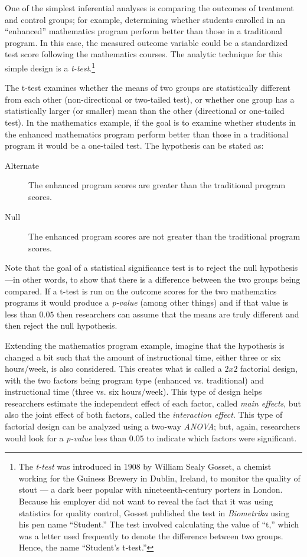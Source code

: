 One of the simplest inferential analyses is comparing the outcomes of treatment and control groups; for example, determining whether students enrolled in an ``enhanced'' mathematics program perform better than those in a traditional program. In this case, the measured outcome variable could be a standardized test score following the mathematics courses. The analytic technique for this simple design is a \textit{t-test}.\footnote{The \textit{t-test} was introduced in $ 1908 $ by William Sealy Gosset, a chemist working for the Guiness Brewery in Dublin, Ireland, to monitor the quality of stout --- a dark beer popular with nineteenth-century porters in London. Because his employer did not want to reveal the fact that it was using statistics for quality control, Gosset published the test in \textit{Biometrika} using his pen name ``Student.'' The test involved calculating the value of ``t,'' which was a letter used frequently to denote the difference between two groups. Hence, the name ``Student's t-test.''}

The t-test examines whether the means of two groups are statistically different from each other (non-directional or two-tailed test), or whether one group has a statistically larger (or smaller) mean than the other (directional or one-tailed test). In the mathematics example, if the goal is to examine whether students in the enhanced mathematics program perform better than those in a traditional program it would be a one-tailed test. The hypothesis can be stated as:

\begin{description}
	\item[Alternate] The enhanced program scores are greater than the traditional program scores.
	\item[Null] The enhanced program scores are not greater than the traditional program scores.
\end{description}

Note that the goal of a statistical significance test is to reject the null hypothesis---in other words, to show that there is a difference between the two groups being compared. If a t-test is run on the outcome scores for the two mathematics programs it would produce a \textit{p-value} (among other things) and if that value is less than $ 0.05 $ then researchers can assume that the means are truly different and then reject the null hypothesis.

Extending the mathematics program example, imagine that the hypothesis is changed a bit such that the amount of instructional time, either three or six hours/week, is also considered. This creates what is called a $ 2 x 2 $ factorial design, with the two factors being program type (enhanced vs. traditional) and instructional time (three vs. six hours/week). This type of design helps researchers estimate the independent effect of each factor, called \textit{main effects}, but also the joint effect of both factors, called the \textit{interaction effect}. This type of factorial design can be analyzed using a two-way \textit{ANOVA}; but, again, researchers would look for a \textit{p-value} less than $ 0.05 $ to indicate which factors were significant.

